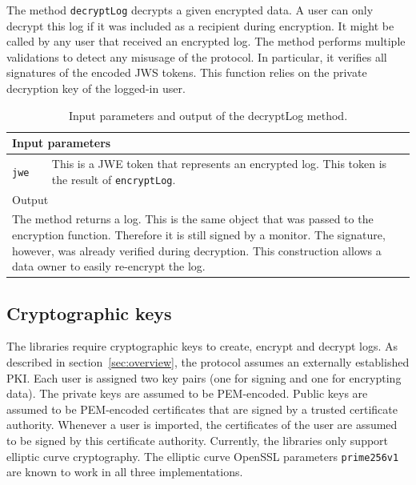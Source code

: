 \documentclass[../main.tex]{subfiles}
\begin{document}
The method \verb|decryptLog| decrypts a given encrypted data.
A user can only decrypt this log if it was included as a recipient during encryption.
It might be called by any user that received an encrypted log.
The method performs multiple validations to detect any misusage of the protocol.
In particular, it verifies all signatures of the encoded JWS tokens.
This function relies on the private decryption key of the logged-in user.
\begin{table}[ht]
    \centering
    \begin{tabular}{|p{3cm}p{10cm}|}
        \hline
        \multicolumn{2}{|l|}{Input parameters}    \\ \hline
        \verb|jwe|              & This is a JWE token that represents an encrypted log. This token is the result of \verb|encryptLog|. \\ \hline
            \multicolumn{2}{|l|}{Output}   \\ \hline
        \multicolumn{2}{|p{13cm}|}{The method returns a log. This is the same object that was passed to the encryption function. Therefore it is still signed by a monitor. The signature, however, was already verified during decryption. This construction allows a data owner to easily re-encrypt the log.} \\ \hline
    \end{tabular}
    \caption[Signature of decryptLog]{Input parameters and output of the decryptLog method.}
\end{table}

\subsection{Cryptographic keys}
The libraries require cryptographic keys to create, encrypt and decrypt logs.
As described in section~\ref{sec:overview}, the protocol assumes an externally established PKI.
Each user is assigned two key pairs (one for signing and one for encrypting data).
The private keys are assumed to be PEM-encoded.
Public keys are assumed to be PEM-encoded certificates that are signed by a trusted certificate authority.
Whenever a user is imported, the certificates of the user are assumed to be signed by this certificate authority.
Currently, the libraries only support elliptic curve cryptography.
The elliptic curve OpenSSL parameters \verb|prime256v1| are known to work in all three implementations.
\end{document}
